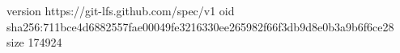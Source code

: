 version https://git-lfs.github.com/spec/v1
oid sha256:711bce4d6882557fae00049fe3216330ee265982f66f3db9d8e0b3a9b6f6ce28
size 174924
